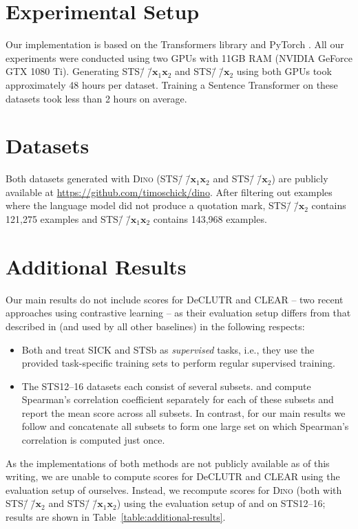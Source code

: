 \documentclass[11pt]{article}
\newcommand\ours{\textsc{Dino}}
\newcommand\ourDsFull{STS\=/🦕\=/$\mathbf{x}_1\mathbf{x}_2$}
\newcommand\ourDsSemi{STS\=/🦕\=/$\mathbf{x}_2$}
\begin{document}



\clearpage
\appendix
\section{Experimental Setup}

Our implementation is based on the Transformers library \citep{wolf2019transformers} and PyTorch \citep{paszke2017automatic}. All our experiments were conducted using two GPUs with 11GB RAM (NVIDIA GeForce GTX 1080 Ti). Generating \ourDsFull{} and \ourDsSemi{} using both GPUs took approximately 48 hours per dataset. Training a Sentence Transformer on these datasets took less than 2 hours on average.

\section{Datasets}

Both datasets generated with \ours{} (\ourDsFull{} and \ourDsSemi{}) are publicly available at \url{https://github.com/timoschick/dino}. After filtering out examples where the language model did not produce a quotation mark, \ourDsSemi{} contains 121,275 examples and \ourDsFull{} contains 143,968 examples.

\section{Additional Results}

Our main results do not include scores for DeCLUTR \citep{giorgi2020declutr} and CLEAR \citep{wu2020clear} -- two recent approaches using contrastive learning -- as their evaluation setup differs from that described in \citet{reimers-gurevych-2019-sentence} (and used by all other baselines) in the following respects:
\begin{itemize}
	\item Both \citet{giorgi2020declutr} and \citet{wu2020clear} treat SICK and STSb as \emph{supervised} tasks, i.e., they use the provided task-specific training sets to perform regular supervised training.
	\item The STS12--16 datasets each consist of several subsets. \citet{giorgi2020declutr} and \citet{wu2020clear} compute Spearman's correlation coefficient separately for each of these subsets and report the mean score across all subsets. In contrast, for our main results we follow \citet{reimers-gurevych-2019-sentence} and concatenate all subsets to form one large set on which Spearman's correlation is computed just once.
\end{itemize}
As the implementations of both methods are not publicly available as of this writing, we are unable to compute scores for DeCLUTR and CLEAR using the evaluation setup of \citet{reimers-gurevych-2019-sentence} ourselves. Instead, we recompute scores for \ours{} (both with \ourDsSemi{} and \ourDsFull{}) using the evaluation setup of \citet{giorgi2020declutr} and \citet{wu2020clear} on STS12--16; results are shown in Table~\ref{table:additional-results}.
\end{document}
